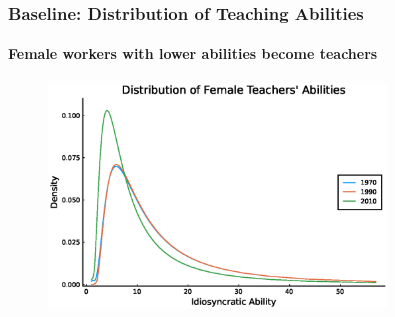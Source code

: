 \documentclass[11pt]{beamer}
\begin{document}

\begin{frame}
\frametitle{Baseline: Distribution of Teaching Abilities}
\framesubtitle{Female workers with lower abilities become teachers}
\label{base_femaleabil}
\begin{figure}
 \begin{center}
\includegraphics[width=0.8\textwidth]{fT_women_steadystate.eps}
 			\label{ }
 		\end{center}
 	\end{figure}
  \hyperlink{counter_femaleabil}{} %
\end{frame}
\end{document}
